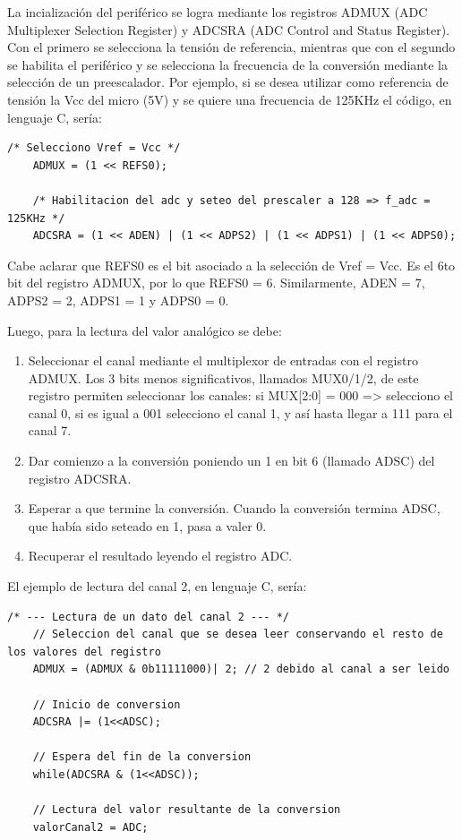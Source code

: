 La incialización del periférico se logra mediante los registros ADMUX (ADC Multiplexer Selection Register) y ADCSRA (ADC Control and Status Register). Con el primero se selecciona la tensión de referencia, mientras que con el segundo se habilita el periférico y se selecciona la frecuencia de la conversión mediante la selección de un preescalador. Por ejemplo, si se desea utilizar como referencia de tensión la Vcc del micro (5V) y se quiere una frecuencia de 125KHz el código, en lenguaje C, sería:
\begin{lstlisting}[style=CStyle]
	/* Selecciono Vref = Vcc */
	ADMUX = (1 << REFS0);

	/* Habilitacion del adc y seteo del prescaler a 128 => f_adc = 125KHz */
	ADCSRA = (1 << ADEN) | (1 << ADPS2) | (1 << ADPS1) | (1 << ADPS0); 
\end{lstlisting}
Cabe aclarar que REFS0 es el bit asociado a la selección de Vref = Vcc. Es el 6to bit del registro ADMUX, por lo que REFS0 = 6. Similarmente, ADEN = 7, ADPS2 = 2, ADPS1 = 1 y ADPS0 = 0.

Luego, para la lectura del valor analógico se debe:
\begin{enumerate}
	\item Seleccionar el canal mediante el multiplexor de entradas con el registro ADMUX. Los 3 bits menos significativos, llamados MUX0/1/2, de este registro permiten seleccionar los canales: si MUX[2:0] = 000 => selecciono el canal 0, si es igual a 001 selecciono el canal 1, y así hasta llegar a 111 para el canal 7.

	\item Dar comienzo a la conversión poniendo un 1 en bit 6 (llamado ADSC) del registro ADCSRA.
	\item Esperar a que termine la conversión. Cuando la conversión termina ADSC, que había sido seteado en 1, pasa a valer 0.
	\item Recuperar el resultado leyendo el registro ADC.
\end{enumerate}

El ejemplo de lectura del canal 2, en lenguaje C, sería:
\begin{lstlisting}[style=CStyle]
	/* --- Lectura de un dato del canal 2 --- */
	// Seleccion del canal que se desea leer conservando el resto de los valores del registro
	ADMUX = (ADMUX & 0b11111000)| 2; // 2 debido al canal a ser leido
	
	// Inicio de conversion
	ADCSRA |= (1<<ADSC);
	
	// Espera del fin de la conversion
	while(ADCSRA & (1<<ADSC));
	
	// Lectura del valor resultante de la conversion
	valorCanal2 = ADC;
\end{lstlisting}

